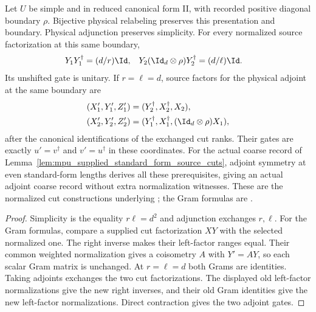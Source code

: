 \begin{lemma}
    \label{lem:mpu_normalized_physical_adjoint_source_factors}
    \leanok
    Let $U$ be simple and in reduced canonical form II, with recorded positive
    diagonal boundary $\rho$. Bijective physical relabeling preserves this
    presentation and boundary. Physical adjunction preserves simplicity.
    For every normalized source factorization at this same boundary,
    \begin{align}
        Y_1Y_1^\dagger                   & =(d/r)\Id,    &
        Y_2(\Id_d\otimes\rho)Y_2^\dagger & =(d/\ell)\Id.
    \end{align}
    Its unshifted gate is unitary. If $r=\ell=d$, source factors for the
    physical adjoint at the same boundary are
    \begin{align}
        (X_1',Y_1',Z_1') & =(Y_2^\dagger,X_2^\dagger,X_2), \\
        (X_2',Y_2',Z_2') & =(Y_1^\dagger,X_1^\dagger,
        (\Id_d\otimes\rho)X_1),
    \end{align}
    after the canonical identifications of the exchanged cut ranks.
    Their gates are exactly $u'=v^\dagger$ and $v'=u^\dagger$ in these
    coordinates. For the actual coarse record of
    Lemma~\ref{lem:mpu_supplied_standard_form_source_cuts}, adjoint symmetry
    at even standard-form lengths derives all these prerequisites, giving an
    actual adjoint coarse record without extra normalization witnesses.
    These are the normalized cut constructions underlying
    \cite[lines~1237--1252]{Cirac2017MPU}; the Gram formulas are
    \cite[lines~1326--1398]{FrancoRubio2025MPUGauging}.
\end{lemma}

\begin{proof}\leanok
    Simplicity is the equality $r\ell=d^2$ and adjunction exchanges $r,\ell$.
    For the Gram formulas, compare a supplied cut factorization $XY$ with
    the selected normalized one. The right inverse makes their left-factor
    ranges equal. Their common weighted normalization gives a coisometry
    $A$ with $Y'=AY$, so each scalar Gram matrix is unchanged.
    At $r=\ell=d$ both Grams are identities. Taking adjoints exchanges the
    two cut factorizations. The displayed old left-factor normalizations
    give the new right inverses, and their old Gram identities give the new
    left-factor normalizations. Direct contraction gives the two adjoint gates.
\end{proof}

